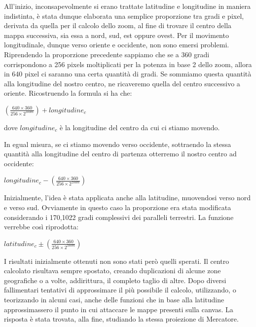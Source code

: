 All'inizio, inconsapevolmente si erano trattate latitudine e longitudine in maniera indistinta, è stata dunque elaborata una semplice proporzione tra gradi e pixel, derivata da quella per il calcolo dello zoom, al fine di trovare il centro della mappa successiva, sia essa a nord, sud, est oppure ovest. Per il movimento longitudinale, dunque verso oriente e occidente, non sono emersi problemi. Riprendendo la proporzione precedente sappiamo che se a 360 gradi corrispondono a 256 pixels moltiplicati per la potenza in base 2 dello zoom, allora in 640 pixel ci saranno una certa quantità di gradi. Se sommiamo questa quantità alla longitudine del nostro centro, ne ricaveremo quella del centro successivo a oriente.
Ricostruendo la formula si ha che:
\begin{center}

	\large$ (\frac{640\times360}{256\times2^{zoom}}) + longitudine_{c} $\par

\end{center}
dove $longitudine_{c}$ è la longitudine del centro da cui ci stiamo movendo. 

In egual misura, se ci stiamo movendo verso occidente, sottraendo la stessa quantità alla longitudine del centro di partenza otterremo il nostro centro ad occidente:
\begin{center}

	\large$  longitudine_{c} - (\frac{640\times360}{256\times2^{zoom}}) $\par

\end{center}

Inizialmente, l'idea è stata applicata anche alla latitudine, muovendosi verso nord e verso sud. Ovviamente in questo caso la proporzione era stata modificata considerando i 170,1022 gradi complessivi dei paralleli terrestri. La funzione verrebbe così riprodotta:
\begin{center}

	\large$  latitudine_{c} \pm (\frac{640\times360}{256\times2^{zoom}}) $\par

\end{center}

I risultati inizialmente ottenuti non sono stati però quelli sperati. Il centro calcolato risultava sempre spostato, creando duplicazioni di alcune zone geografiche o a volte, addirittura, il completo taglio di altre. Dopo diversi fallimentari tentativi di approssimare il più possibile il calcolo, utilizzando, o teorizzando in alcuni casi, anche delle funzioni che in base alla latitudine approssimassero il punto in cui attaccare le mappe presenti sulla canvas. La risposta è stata trovata, alla fine, studiando la stessa proiezione di Mercatore.

